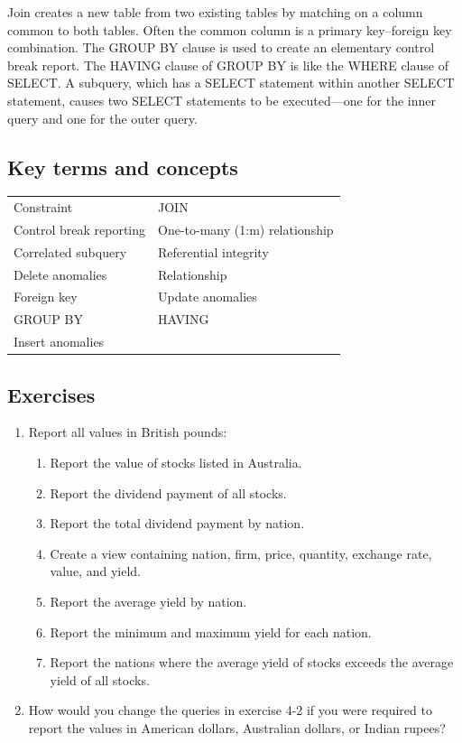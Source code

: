 \documentclass[
]{article}
\begin{document}
Join creates a new table from two existing tables by matching on a
column common to both tables. Often the common column is a primary
key--foreign key combination. The GROUP BY clause is used to create an
elementary control break report. The HAVING clause of GROUP BY is like
the WHERE clause of SELECT. A subquery, which has a SELECT statement
within another SELECT statement, causes two SELECT statements to be
executed---one for the inner query and one for the outer query.

\hypertarget{key-terms-and-concepts-1}{%
\subsection*{Key terms and concepts}\label{key-terms-and-concepts-1}}

\begin{longtable}[]{@{}ll@{}}
\toprule()
\endhead
Constraint & JOIN \\
Control break reporting & One-to-many (1:m) relationship \\
Correlated subquery & Referential integrity \\
Delete anomalies & Relationship \\
Foreign key & Update anomalies \\
GROUP BY & HAVING \\
Insert anomalies & \\
\bottomrule()
\end{longtable}

\hypertarget{exercises-1}{%
\subsection*{Exercises}\label{exercises-1}}

\begin{enumerate}
\def\labelenumi{\arabic{enumi}.}
\setcounter{enumi}{1}
\item
  Report all values in British pounds:

  \begin{enumerate}
  \def\labelenumii{\alph{enumii}.}
  \item
    Report the value of stocks listed in Australia.
  \item
    Report the dividend payment of all stocks.
  \item
    Report the total dividend payment by nation.
  \item
    Create a view containing nation, firm, price, quantity, exchange
    rate, value, and yield.
  \item
    Report the average yield by nation.
  \item
    Report the minimum and maximum yield for each nation.
  \item
    Report the nations where the average yield of stocks exceeds the
    average yield of all stocks.
  \end{enumerate}
\item
  How would you change the queries in exercise 4-2 if you were required
  to report the values in American dollars, Australian dollars, or
  Indian rupees?
\end{enumerate}
\end{document}
